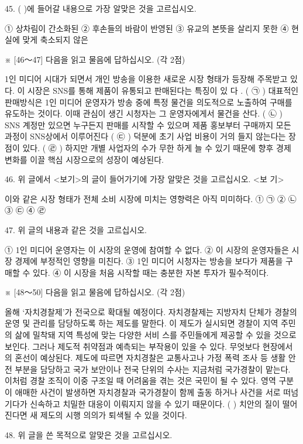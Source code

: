 \documentclass[12pt]{article}
\begin{document}
\begin{enumerate}[1.]
45. (   )에 들어갈 내용으로 가장 알맞은 것을 고르십시오.

① 상차림이 간소화된
② 후손들의 바람이 반영된
③ 유교의 본뜻을 살리지 못한
④ 현실에 맞게 축소되지 않은




※ [46～47] 다음을 읽고 물음에 답하십시오. (각 2점)

  1인 미디어 시대가 되면서 개인 방송을 이용한 새로운 시장 형태가 등장해
주목받고 있다. 이 시장은 SNS를 통해 제품이 유통되고 판매된다는 특징이
있 다 . ( ㉠ ) 대표적인 판매방식은 1인 미디어 운영자가 방송 중에
특정 물건을 의도적으로 노출하여 구매를 유도하는 것이다. 이때 관심이
생긴 시청자는 그 운영자에게서 물건을 산다. ( ㉡ ) SNS 계정만
있으면 누구든지 판매를 시작할 수 있으며 제품 홍보부터 구매까지 모든
과정이 SNS상에서 이루어진다 ( ㉢ ) 덕분에 초기 사업 비용이 거의
들지 않는다는 장점이 있다. ( ㉣ ) 하지만 개별 사업자의 수가 무한
하게 늘 수 있기 때문에 향후 경제 변화를 이끌 핵심 시장으로의 성장이
예상된다.


46.
위 글에서 <보기>의 글이 들어가기에 가장 알맞은 것을 고르십시오.
<보 기>

이와 같은 시장 형태가 전체 소비 시장에 미치는 영향력은 아직 미미하다.
① ㉠	② ㉡	③ ㉢	④ ㉣


47. 위 글의 내용과 같은 것을 고르십시오.

① 1인 미디어 운영자는 이 시장의 운영에 참여할 수 없다.
② 이 시장의 운영자들은 시장 경제에 부정적인 영향을 미친다.
③ 1인 미디어 시청자는 방송을 보다가 제품을 구매할 수 있다.
④ 이 시장을 처음 시작할 때는 충분한 자본 투자가 필수적이다.




※ [48～50] 다음을 읽고 물음에 답하십시오. (각 2점)

  올해 ‘자치경찰제’가 전국으로 확대될 예정이다. 자치경찰제는 지방자치
단체가 경찰의 운영 및 관리를 담당하도록 하는 제도를 말한다. 이 제도가
실시되면 경찰이 지역 주민의 삶에 밀착돼 지역 특성에 맞는 다양한 서비
스를 주민들에게 제공할 수 있을 것으로 보인다. 그러나 제도적 취약점과
예측되는 부작용이 있을 수 있다. 무엇보다 현장에서의 혼선이 예상된다.
제도에 따르면 자치경찰은 교통사고나 가정 폭력 조사 등 생활 안전 부분을
담당하고 국가 보안이나 전국 단위의 수사는 지금처럼 국가경찰이 맡는다.
이처럼 경찰 조직이 이중 구조일 때 어려움을 겪는 것은 국민이 될 수 있다.
영역 구분이 애매한 사건이 발생하면 자치경찰과 국가경찰이 함께 출동
하거나 사건을 서로 떠넘기다가 신속하고 치밀한 대응이 이뤄지지 않을
수 있기 때문이다. (      ) 치안의 질이 떨어진다면 새 제도의
시행 의의가 퇴색될 수 있을 것이다.


48. 위 글을 쓴 목적으로 알맞은 것을 고르십시오.


\end{enumerate}
\end{document}

